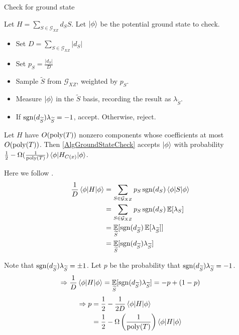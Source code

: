 \begin{algorithm}
	\caption{Check for ground state}
	\label{AlgGroundStateCheck}
		Let $H=\sum_{S\in\mathcal{G}_{XZ}} d_S S$.
		Let $\ket\phi$ be the potential ground state to check.
		\begin{itemize}
			\item Set $D = \sum_{S\in\mathcal{G}_{XZ}}|d_S|$
			\item Set $p_S = \frac{|d_S|}{D}$
			\item Sample $\widetilde{S}$ from $\mathcal{G}_{XZ}$, weighted by $p_S$.
			\item Measure $\ket\phi$ in the $\widetilde{S}$ basis, recording the result as $\lambda_{\widetilde{S}}$.
			\item If $\operatorname{sgn}(d_{\widetilde{S}})\lambda_{\widetilde{S}}=-1$, accept. Otherwise, reject.
		\end{itemize}
\end{algorithm}

\begin{thm}
	Let $H$ have $O(\operatorname*{\operatorname{poly}}(T))$ nonzero components whose coefficients at most $O(\operatorname*{\operatorname{poly}}(T))$.
	Then \cref{AlgGroundStateCheck} accepts $\ket{\phi}$ with probability $\frac{1}{2}-\Omega(\frac{1}{\operatorname*{\operatorname{poly}}(T)})\braket{\phi|H_{C(x)}|\phi}$.
\end{thm}
\begin{prf}
	Here we follow \cite{PhysRevA.93.022326}.
	\begin{align*}
		\frac{1}{D}\braket{\phi|H|\phi}&=\sum_{S\in\mathcal{G}_{XZ}} p_S\operatorname{sgn}(d_S)\braket{\phi|S|\phi}\\
		&=\sum_{S\in\mathcal{G}_{XZ}} p_S\operatorname{sgn}(d_S)\operatorname*{\mathbb{E}}[\lambda_S]\\
		&=\operatorname*{\mathbb{E}}_{\widetilde{S}}[\operatorname{sgn}(d_{\widetilde{S}})\operatorname*{\mathbb{E}}[\lambda_{\widetilde{S}}]]\\
		&=\operatorname*{\mathbb{E}}_{\widetilde{S}}[\operatorname{sgn}(d_{\widetilde{S}})\lambda_{\widetilde{S}}]
	\end{align*}

	Note that $\operatorname{sgn}(d_{\widetilde{S}})\lambda_{\widetilde{S}}=\pm1$. Let $p$ be the probability that $\operatorname{sgn}(d_{\widetilde{S}})\lambda_{\widetilde{S}}=-1$.
	$$\Rightarrow \frac{1}{D}\braket{\phi|H|\phi}=\operatorname*{\mathbb{E}}_{\widetilde{S}}[\operatorname{sgn}(d_{\widetilde{S}})\lambda_{\widetilde{S}}]=-p+(1-p)$$
	\begin{align*}
		\Rightarrow p&=\frac{1}{2}-\frac{1}{2D}\braket{\phi|H|\phi}\\
		&=\frac{1}{2}-\Omega\left(\frac{1}{\operatorname*{\operatorname{poly}}(T)}\right)\braket{\phi|H|\phi}
	\end{align*}
\end{prf}

